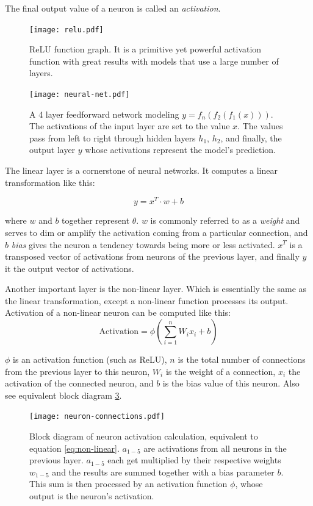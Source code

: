 The final output value of a neuron is called an \emph{activation}.

\begin{figure}[ht]
  \centering
  \texttt{[image: relu.pdf]}
  \caption{ReLU function graph. It is a primitive yet powerful activation function with great results with models that use a large number of layers.}
  \label{fig:relu}
\end{figure}

\begin{figure}[ht]
  \centering
  \texttt{[image: neural-net.pdf]}
  \caption{A 4 layer feedforward network modeling $y = f_{n}(f_{2}(f_{1}(x)))$. The activations of the input layer are set to the value $x$. The values pass from left to right through hidden layers $h_{1}$, $h_{2}$, and finally, the output layer $y$ whose activations represent the model's prediction.}
  \label{fig:ff}
\end{figure}

\medskip
The linear layer is a cornerstone of neural networks. It computes a linear transformation like this:

\begin{equation}
  y = x^{T} \cdot w + b
\end{equation}

where $w$ and $b$ together represent $\theta$. $w$ is commonly referred to as a \emph{weight} and serves to dim or amplify the activation coming from a particular connection, and $b$ \emph{bias} gives the neuron a tendency towards being more or less activated. $x^{T}$ is a transposed vector of activations from neurons of the previous layer, and finally $y$ it the output vector of activations.

Another important layer is the non-linear layer. Which is essentially the same as the linear transformation, except a non-linear function processes its output. Activation of a non-linear neuron can be computed like this:
\begin{equation}
\text{Activation} = \phi\left(\sum_{i=1}^{n} W_{i}x_{i} + b\right)
\label{eq:non-linear}
\end{equation}

$\phi$ is an activation function (such as ReLU), $n$ is the total number of connections from the previous layer to this neuron, $W_{i}$ is the weight of a connection, $x_{i}$ the activation of the connected neuron, and $b$ is the bias value of this neuron. Also see equivalent block diagram \ref{fig:neuron}.

\begin{figure}[ht]
  \centering
  \texttt{[image: neuron-connections.pdf]}
  \caption{Block diagram of neuron activation calculation, equivalent to equation \ref{eq:non-linear}. $a_{1-5}$ are activations from all neurons in the previous layer. $a_{1-5}$ each get multiplied by their respective weights $w_{1-5}$ and the results are summed together with a bias parameter $b$. This sum is then processed by an activation function $\phi$, whose output is the neuron's activation. }
  \label{fig:neuron}
\end{figure}

